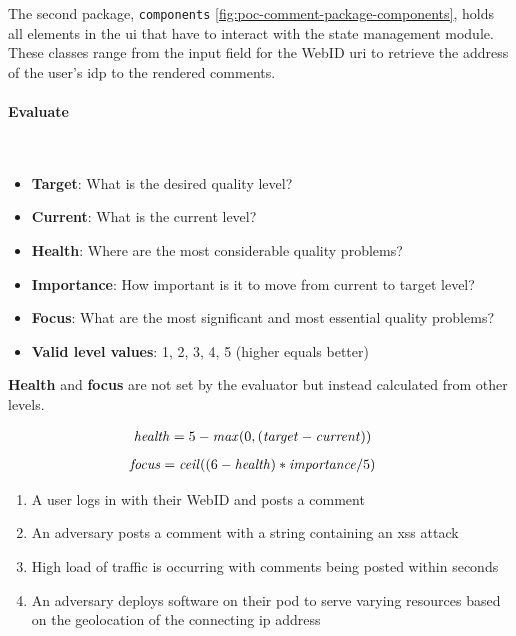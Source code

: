 The second package, \texttt{components} \ref{fig:poc-comment-package-components}, holds all elements in the \gls{ui} that have to interact with the state management module. These classes range from the input field for the WebID \gls{uri} to retrieve the address of the user's \gls{idp} to the rendered comments.
\vspace{0.5cm}
\paragraph{Evaluate}\mbox{}\\

\begin{itemize}
    \item \textbf{Target}: What is the desired quality level?
    \item \textbf{Current}: What is the current level?
    \item \textbf{Health}: Where are the most considerable quality problems?
    \item \textbf{Importance}: How important is it to move from current to target level?
    \item \textbf{Focus}: What are the most significant and most essential quality problems?
    \item \textbf{Valid level values}: 1, 2, 3, 4, 5 (higher equals better)
\end{itemize}

\textbf{Health} and \textbf{focus} are not set by the evaluator but instead calculated from other levels.

\begin{align*}
    \text{\textit{health}}&=5 - \text{\textit{max}}(0, (\text{\textit{target}} - \text{\textit{current}}))
\end{align*}
\vspace{-5mm}
\begin{align*}
    \text{\textit{focus}}&= \text{\textit{ceil}}((6 - \text{\textit{health}}) * \text{\textit{importance}}/5)
\end{align*}

\begin{enumerate}
    \item A user logs in with their WebID and posts a comment
    \item An adversary posts a comment with a string containing an \gls{xss} attack
    \item High load of traffic is occurring with comments being posted within seconds
    \item An adversary deploys software on their pod to serve varying resources based on the geolocation of the connecting \gls{ip} address
\end{enumerate}

